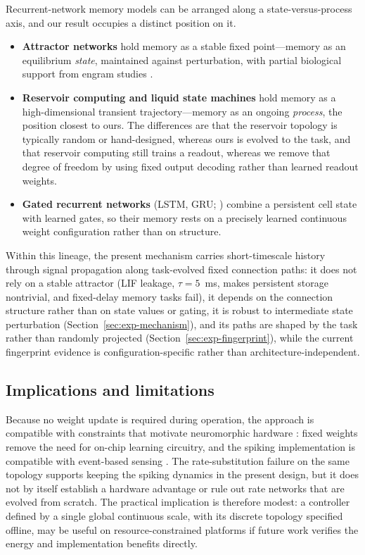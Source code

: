 \documentclass[10pt]{article}
\begin{document}
Recurrent-network memory models can be arranged along a state-versus-process axis,
and our result occupies a distinct position on it.
\begin{itemize}
\item \textbf{Attractor networks} \citep{hopfield1982,amit1989,amari1977} hold
memory as a stable fixed point---memory as an equilibrium \emph{state}, maintained
against perturbation, with partial biological support from engram studies
\citep{tonegawa2015,josselyn2020,liu2012}.
\item \textbf{Reservoir computing and liquid state machines}
\citep{jaeger2001,maass2002,lukosevicius2009,tanaka2019} hold memory as a
high-dimensional transient trajectory---memory as an ongoing \emph{process}, the
position closest to ours. The differences are that the reservoir topology is
typically random or hand-designed, whereas ours is evolved to the task, and that
reservoir computing still trains a readout, whereas we remove that degree of
freedom by using fixed output decoding rather than learned readout weights.
\item \textbf{Gated recurrent networks} (LSTM, GRU; \citealp{hochreiter1997,cho2014})
combine a persistent cell state with learned gates, so their memory rests on a
precisely learned continuous weight configuration rather than on structure.
\end{itemize}
Within this lineage, the present mechanism carries short-timescale history
through signal propagation along task-evolved fixed connection paths: it does
not rely on a stable attractor (LIF leakage, $\tau=5$~ms, makes persistent
storage nontrivial, and fixed-delay memory tasks fail), it depends on the
connection structure rather than on state values or gating, it is
robust to intermediate state perturbation (Section~\ref{sec:exp-mechanism}), and
its paths are shaped by the task rather than randomly projected
(Section~\ref{sec:exp-fingerprint}), while the current fingerprint evidence is
configuration-specific rather than architecture-independent.

\subsection{Implications and limitations}

Because no weight update is required during operation, the approach is
compatible with constraints that motivate neuromorphic hardware
\citep{davies2018,roy2019,schuman2017}: fixed weights remove the need for
on-chip learning circuitry, and the spiking implementation is compatible with
event-based sensing \citep{paredes2020}. The rate-substitution failure on the
same topology supports keeping the spiking dynamics in the present design, but
it does not by itself establish a hardware advantage or rule out rate networks
that are evolved from scratch. The practical implication is therefore modest: a
controller defined by a single global continuous scale, with its discrete
topology specified offline, may be useful on resource-constrained platforms if
future work verifies the energy and implementation benefits directly.
\end{document}
